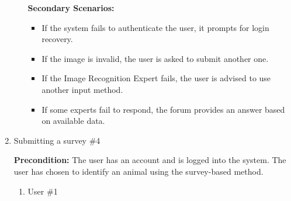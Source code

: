 \documentclass[]{article}
\begin{document}
\begin{enumerate}[{\bf BE1.}]
\begin{enumerate}[{\bf VP1.}]
\noindent \textbf{Secondary Scenarios:}
\begin{itemize}
    \item If the system fails to authenticate the user, it prompts for login recovery.
    \item If the image is invalid, the user is asked to submit another one.
    \item If the Image Recognition Expert fails, the user is advised to use another input method.
    \item If some experts fail to respond, the forum provides an answer based on available data.
\end{itemize}
\end{enumerate}

\item Submitting a survey \#4

\textbf{Precondition:} The user has an account and is logged into the system. The user has chosen to identify an animal using the survey-based method.

\begin{enumerate}[{\bf VP1.}]
    \item User \#1 \\


\end{enumerate}
\end{enumerate}
\end{document}
